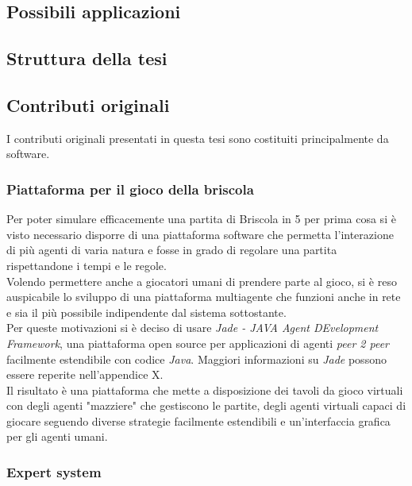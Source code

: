 \documentclass[runningheads,a4paper]{llncs}
\begin{document}
\subsection{Possibili applicazioni}
\subsection{Struttura della tesi}
\subsection{Contributi originali}
I contributi originali presentati in questa tesi sono costituiti principalmente da software.
\subsubsection{Piattaforma per il gioco della briscola}
Per poter simulare efficacemente una partita di Briscola in 5 per prima cosa si è visto necessario disporre di una piattaforma software che permetta l'interazione di più agenti di varia natura e fosse in grado di regolare una partita rispettandone i tempi e le regole.\\
Volendo permettere anche a giocatori umani di prendere parte al gioco, si è reso auspicabile lo sviluppo di una piattaforma multiagente che funzioni anche in rete e sia il più possibile indipendente dal sistema sottostante.\\
Per queste motivazioni si è deciso di usare \emph{Jade - JAVA Agent DEvelopment Framework}, una piattaforma open source per applicazioni di agenti \emph{peer 2 peer} facilmente estendibile con codice \emph{Java}.
Maggiori informazioni su \emph{Jade} possono essere reperite nell'appendice X.\\
Il risultato è una piattaforma che mette a disposizione dei tavoli da gioco virtuali con degli agenti "mazziere" che gestiscono le partite, degli agenti virtuali capaci di giocare seguendo diverse strategie facilmente estendibili e un'interfaccia grafica per gli agenti umani.

\subsubsection{Expert system}
\end{document}
